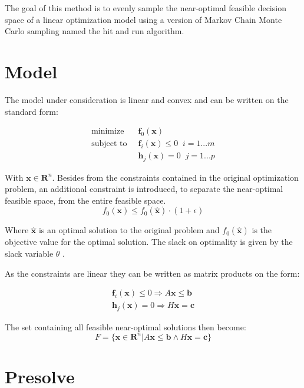 \documentclass[11pt,a4paper,english]{article}
\begin{document}
	
The goal of this method is to evenly sample the near-optimal feasible decision space of a linear optimization model using a version of Markov Chain Monte Carlo sampling named the hit and run algorithm.
	
\section{Model}

The model under consideration is linear and convex and can be written on the standard form: 

\begin{align}\label{eq:ConvexOptimization}
\text{minimize} \;&\; \mathbf{f}_0(\mathbf{x})  \\
	\text{subject to} \; &\; \mathbf{f}_i(\mathbf{x}) \leq 0 \; \; i=1...m\\
\;            &\;  \mathbf{h}_j(\mathbf{x}) = 0 \; \; j=1...p
\end{align}

With $\mathbf{x}\in \mathbf{R}^n$. Besides from the constraints contained in the original optimization problem, an additional constraint is introduced, to separate the near-optimal feasible space, from the entire feasible space. 
\begin{equation}\label{eq:MGA_const}
f_0(\mathbf{x}) \leq f_0(\mathbf{\hat{x}})\cdot (1+\epsilon)
\end{equation}

Where $\mathbf{\hat{x}}$ is an optimal solution to the original problem and $f_0(\mathbf{\hat{x}})$ is the objective value for the optimal solution. The slack on optimality is given by the slack variable $\theta$ .

As the constraints are linear they can be written as matrix products on the form: 

\begin{align}
\mathbf{f}_i(\mathbf{x}) \leq 0 \Rightarrow A  \mathbf{x}  \leq \mathbf{b} \\
\mathbf{h}_j(\mathbf{x}) = 0 \Rightarrow H  \mathbf{x} = \mathbf{c}
\end{align}

The set containing all feasible near-optimal solutions then become:
\begin{equation}
F = \{\mathbf{x} \in \mathbf{R}^n | A  \mathbf{x}  \leq \mathbf{b} \wedge H  \mathbf{x} = \mathbf{c} \}
\end{equation}


\section{Presolve}
\end{document}
